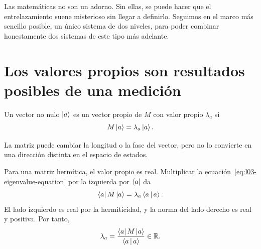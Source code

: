 \begin{classroomqa}
\end{classroomqa}

\begin{classroomqa}
\end{classroomqa}

Las matemáticas no son un adorno. Sin ellas, se puede hacer que el entrelazamiento suene misterioso sin llegar a definirlo. Seguimos en el marco más sencillo posible, un único sistema de dos niveles, para poder combinar honestamente dos sistemas de este tipo más adelante.

\section{Los valores propios son resultados posibles de una medición}

\begin{definition}
Un vector no nulo \(\left\lvert a\right\rangle\) es un vector propio de \(M\) con valor propio \(\lambda_a\) si
\begin{equation}
  M\left\lvert a\right\rangle=\lambda_a\left\lvert a\right\rangle.
  \label{eq:l03-eigenvalue-equation}
\end{equation}
\end{definition}
La matriz puede cambiar la longitud o la fase del vector, pero no lo convierte en una dirección distinta en el espacio de estados.

Para una matriz hermítica, el valor propio es real. Multiplicar la ecuación~\eqref{eq:l03-eigenvalue-equation} por la izquierda por \(\left\langle a\right\rvert\) da
\begin{equation}
  \left\langle a\right\rvert M\left\lvert a\right\rangle
  =\lambda_a\left\langle a\,\middle|\,a\right\rangle.
\end{equation}
El lado izquierdo es real por la hermiticidad, y la norma del lado derecho es real y positiva. Por tanto,
\begin{equation}
  \lambda_a
  =
  \frac{\left\langle a\right\rvert M\left\lvert a\right\rangle}{\left\langle a\,\middle|\,a\right\rangle}
  \in\mathbb R.
  \label{eq:l03-real-eigenvalue}
\end{equation}

